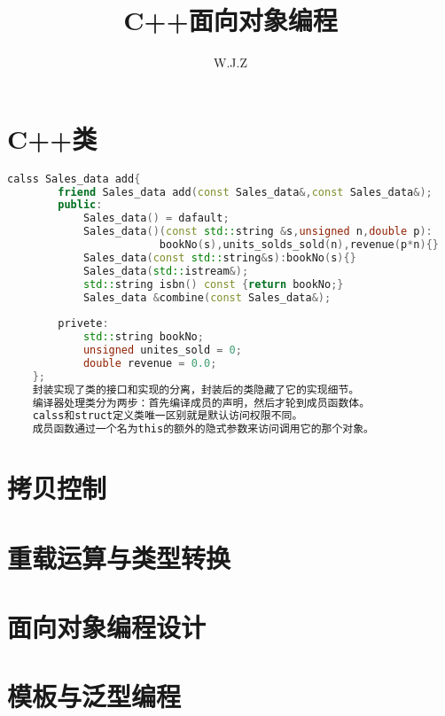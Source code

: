 \documentclass{article}
\title{C++面向对象编程}
\author{W.J.Z}
\date{}
\begin{document}
	\maketitle
	\section{C++类}
	\begin{lstlisting}[language=C++,tabsize=2]
	calss Sales_data add{
		friend Sales_data add(const Sales_data&,const Sales_data&);
		public:
			Sales_data() = dafault;
			Sales_data()(const std::string &s,unsigned n,double p):
						bookNo(s),units_solds_sold(n),revenue(p*n){}
			Sales_data(const std::string&s):bookNo(s){}
			Sales_data(std::istream&);
			std::string isbn() const {return bookNo;}
			Sales_data &combine(const Sales_data&);
			
		privete:
			std::string bookNo;
			unsigned unites_sold = 0;
			double revenue = 0.0;
	};
	封装实现了类的接口和实现的分离，封装后的类隐藏了它的实现细节。
	编译器处理类分为两步：首先编译成员的声明，然后才轮到成员函数体。
	calss和struct定义类唯一区别就是默认访问权限不同。
	成员函数通过一个名为this的额外的隐式参数来访问调用它的那个对象。
	\end{lstlisting}
	\section{拷贝控制}
	\section{重载运算与类型转换}
	\section{面向对象编程设计}
	\section{模板与泛型编程}
\end{document}
